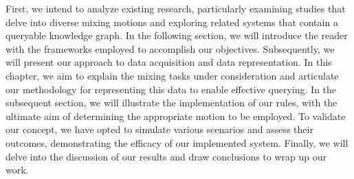 First, we intend to analyze existing research, particularly examining studies that delve into diverse mixing motions and exploring related systems that contain a queryable knowledge graph.
In the following section, we will introduce the reader with the frameworks employed to accomplish our objectives.	
Subsequently, we will present our approach to data acquisition and data representation.
In this chapter, we aim to explain the mixing tasks under consideration and articulate our methodology for representing this data to enable effective querying.
In the subsequent section, we will illustrate the implementation of our rules, with the ultimate aim of determining the appropriate motion to be employed.
To validate our concept, we have opted to simulate various scenarios and assess their outcomes, demonstrating the efficacy of our implemented system.
Finally, we will delve into the discussion of our results and draw conclusions to wrap up our work.
